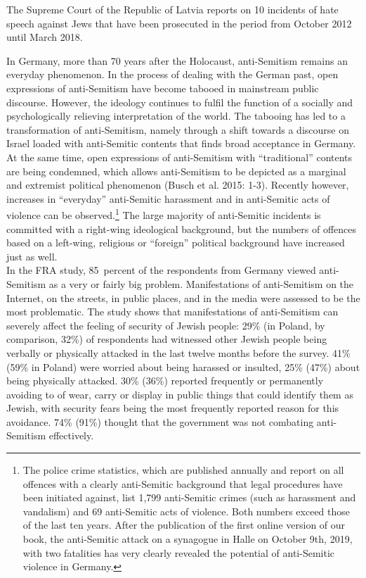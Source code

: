 The Supreme Court of the Republic of Latvia reports on 10 incidents of hate speech against Jews that have been prosecuted in the period from October 2012 until March 2018. \par
In Germany, more than 70 years after the Holocaust, anti-Semitism remains an everyday phenomenon. In the process of dealing with the German past, open expressions of anti-Semitism have become tabooed in mainstream public discourse. However, the ideology continues to fulfil the function of a socially and psychologically relieving interpretation of the world. The tabooing has led to a transformation of anti-Semitism, namely through a shift towards a discourse on Israel loaded with anti-Semitic contents that finds broad acceptance in Germany. At the same time, open expressions of anti-Semitism with ``traditional'' contents are being condemned, which allows anti-Semitism to be depicted as a marginal and extremist political phenomenon (Busch et al. 2015: 1-3). Recently however, increases in ``everyday'' anti-Semitic harassment and in anti-Semitic acts of violence can be observed.\footnote{The police crime statistics, which are published annually and report on all offences with a clearly anti-Semitic background that legal procedures have been initiated against, list 1,799 anti-Semitic crimes (such as harassment and vandalism) and 69 anti-Semitic acts of violence. Both numbers exceed those of the last ten years. After the publication of the first online version of our book, the anti-Semitic attack on a synagogue in Halle on October 9th, 2019, with two fatalities has very clearly revealed the potential of anti-Semitic violence in Germany.} The large majority of anti-Semitic incidents is committed with a right-wing ideological background, but the numbers of offences based on a left-wing, religious or ``foreign'' political background have increased just as well. \\
In the FRA study, 85\ percent of the respondents from Germany viewed anti-Semitism as a very or fairly big problem. Manifestations of anti-Semitism on the Internet, on the streets, in public places, and in the media were assessed to be the most problematic. The study shows that manifestations of anti-Semitism can severely affect the feeling of security of Jewish people: 29\% (in Poland, by comparison, 32\%) of respondents had witnessed other Jewish people being verbally or physically attacked in the last twelve months before the survey. 41\% (59\% in Poland) were worried about being harassed or insulted, 25\% (47\%) about being physically attacked. 30\% (36\%) reported frequently or permanently avoiding to of wear, carry or display in public things that could identify them as Jewish, with security fears being the most frequently reported reason for this avoidance. 74\% (91\%) thought that the government was not combating anti-Semitism effectively.\\  
